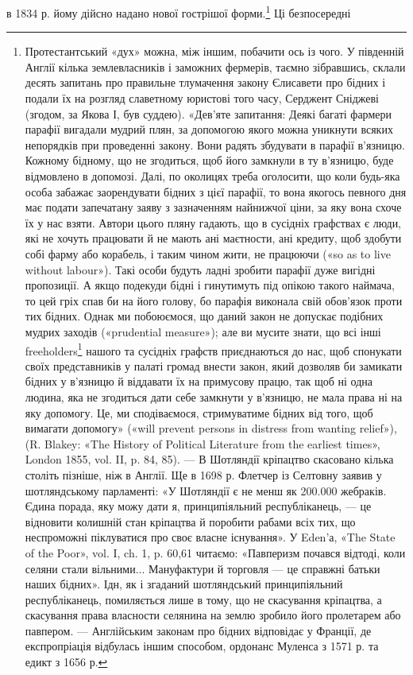 \parcont{}  %
в 1834 р. йому дійсно надано нової гострішої форми.\footnote{
Протестантський «дух» можна, між іншим, побачити ось із чого.
У південній Англії кілька землевласників і заможних фермерів, таємно
зібравшись, склали десять запитань про правильне тлумачення закону
Єлисавети про бідних і подали їх на розгляд славетному юристові того
часу, Серджент Сніджеві (згодом, за Якова І, був суддею). «Дев’яте запитання:
Деякі багаті фармери парафії вигадали мудрий плян, за допомогою
якого можна уникнути всяких непорядків при проведенні закону.
Вони радять збудувати в парафії в’язницю. Кожному бідному, що не
згодиться, щоб його замкнули в ту в’язницю, буде відмовлено в допомозі.
Далі, по околицях треба оголосити, що коли будь-яка особа забажає
заорендувати бідних з цієї парафії, то вона якогось певного дня
має подати запечатану заяву з зазначенням найнижчої ціни, за яку вона
схоче їх у нас взяти. Автори цього пляну гадають, що в сусідніх графствах
є люди, які не хочуть працювати й не мають ані маєтности, ані
кредиту, щоб здобути собі фарму або корабель, і таким чином жити,
не працюючи («so as to live without labour»). Такі особи будуть ладні
зробити парафії дуже вигідні пропозиції. А якщо подекуди бідні і гинутимуть
під опікою такого наймача, то цей гріх спав би на його голову,
бо парафія виконала свій обов’язок проти тих бідних. Однак ми побоюємося,
що даний закон не допускає подібних мудрих заходів («prudential
measure»); але ви мусите знати, що всі інші freeholders\footnote*{
— вільні дрібні господарства. \emph{Ред.}
} нашого та
сусідніх графств приєднаються до нас, щоб спонукати своїх представників
у палаті громад внести закон, який дозволяв би замикати бідних у
в’язницю й віддавати їх на примусову працю, так щоб ні одна людина,
яка не згодиться дати себе замкнути у в’язницю, не мала права ні на яку
допомогу. Це, ми сподіваємося, стримуватиме бідних від того, щоб вимагати
допомогу» («will prevent persons in distress from wanting relief»),
(R. Blakey: «The History of Political Literature from the earliest times»,
London 1855, vol. II, p. 84, 85). — В Шотляндії кріпацтво скасовано
кілька століть пізніше, ніж в Англії. Ще в 1698 р. Флетчер із Селтовну
заявив у шотляндському парламенті: «У Шотляндії є не менш як 200.000
жебраків. Єдина порада, яку можу дати я, принципіяльний республіканець,
— це відновити колишній стан кріпацтва й поробити рабами всіх
тих, що неспроможні піклуватися про своє власне існування». У Eden’а,
«The State of the Poor», vol. I, ch. 1, p. 60,61 читаємо: «Павперизм почався
відтоді, коли селяни стали вільними... Мануфактури й торговля —
це справжні батьки наших бідних». Ідн, як і згаданий шотляндський
принципіяльний республіканець, помиляється лише в тому, що не скасування
кріпацтва, а скасування права власности селянина на землю
зробило його пролетарем або павпером. — Англійським законам про
бідних відповідає у Франції, де експропріація відбулась іншим способом,
ордонанс Муленса з 1571 р. та едикт з 1656 р.
} Ці безпосередні
